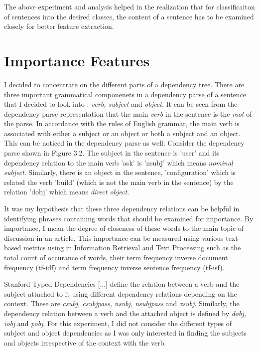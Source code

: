 The above experiment and analysis helped in the realization that for classificaiton of sentences into the desired classes, the content of a sentence has to be examined closely for better feature extraction.

\section{Importance Features}
I decided to concentrate on the different parts of a dependency tree.
There are three important grammatical componenets in a dependency parse of a sentence that I decided to look into : \textit{verb, subject} and \textit{object}.
It can be seen from the dependency parse representation that the main \textit{verb} in the sentence is the \textit{root} of the parse.
In accordance with the rules of English grammar, the main verb is associated with either a subject or an object or both a subject and an object.
This can be noticed in the dependency parse as well.
Consider the dependency parse shown in Figure 3.2.
The subject in the sentence is 'user' and its dependency relation to the main verb 'ask' is 'nsubj' which means \textit{nominal subject}.
Similarly, there is an object in the sentence, 'configuration' which is related the verb 'build' (which is not the main verb in the sentence) by the relation 'dobj' which means \textit{direct object}.

It was my hypothesis that these three dependency relations can be helpful in identifying phrases containing words that should be examined for importance.
By importance, I mean the degree of closeness of these words to the main topic of discussion in an article.
This importance can be measured using various text-based metrics using in Information Retrieval and Text Processing such as the total count of occurance of words, their term frequency inverse document frequency (tf-idf) and term frequency inverse sentence frequency (tf-isf).

Stanford Typed Dependencies [...] define the relation between a verb and the subject attached to it using different dependency relations depending on the context. These are \textit{csubj, csubjpass, nsubj, nsubjpass} and \textit{xsubj}.
Similarly, the dependency relation between a verb and the attached object is defined by \textit{dobj, iobj} and \textit{pobj}.
For this experiment, I did not consider the different types of subject and object dependencies as I was only interested in finding the subjects and objects irrespective of the context with the verb.

